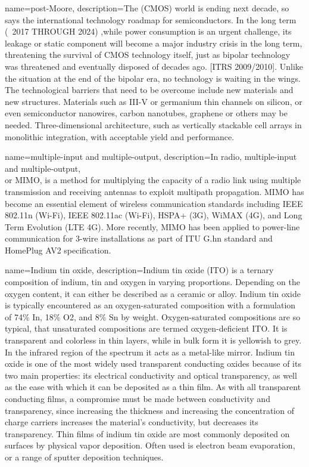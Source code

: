 {
        name=post-Moore,
        description={The (CMOS) world is ending next decade, so says the international technology roadmap for semiconductors. In the long term (~2017 THROUGH 2024) ,while power consumption is an urgent challenge, its leakage or static component will become a major industry crisis in the long term, threatening the survival of CMOS technology itself, just as bipolar technology was threatened and eventually disposed of decades ago. [ITRS 2009/2010]. Unlike the situation at the end of the bipolar era, no technology is waiting in the wings. The technological barriers that need to be overcome include new materials and new structures. Materials such as III-V or germanium thin channels on silicon, or even semiconductor nanowires, carbon nanotubes, graphene or others may be needed. Three-dimensional architecture, such as vertically stackable cell arrays in monolithic integration, with acceptable yield and performance. \cite{bluewaters}}
}

{
        name=multiple-input and multiple-output,
        description={In radio, multiple-input and multiple-output, \\ or MIMO, is a method for multiplying the capacity of a radio link using multiple transmission and receiving antennas to exploit multipath propagation. MIMO has become an essential element of wireless communication standards including IEEE 802.11n (Wi-Fi), IEEE 802.11ac (Wi-Fi), HSPA+ (3G), WiMAX (4G), and Long Term Evolution (LTE 4G). More recently, MIMO has been applied to power-line communication for 3-wire installations as part of ITU G.hn standard and HomePlug AV2 specification.}
}

{
        name=Indium tin oxide,
        description={Indium tin oxide (ITO) is a ternary composition of indium, tin and oxygen in varying proportions. Depending on the oxygen content, it can either be described as a ceramic or alloy. Indium tin oxide is typically encountered as an oxygen-saturated composition with a formulation of 74\% In, 18\% O2, and 8\% Sn by weight. Oxygen-saturated compositions are so typical, that unsaturated compositions are termed oxygen-deficient ITO. It is transparent and colorless in thin layers, while in bulk form it is yellowish to grey. In the infrared region of the spectrum it acts as a metal-like mirror. Indium tin oxide is one of the most widely used transparent conducting oxides because of its two main properties: its electrical conductivity and optical transparency, as well as the ease with which it can be deposited as a thin film. As with all transparent conducting films, a compromise must be made between conductivity and transparency, since increasing the thickness and increasing the concentration of charge carriers increases the material's conductivity, but decreases its transparency. Thin films of indium tin oxide are most commonly deposited on surfaces by physical vapor deposition. Often used is electron beam evaporation, or a range of sputter deposition techniques.}
}

